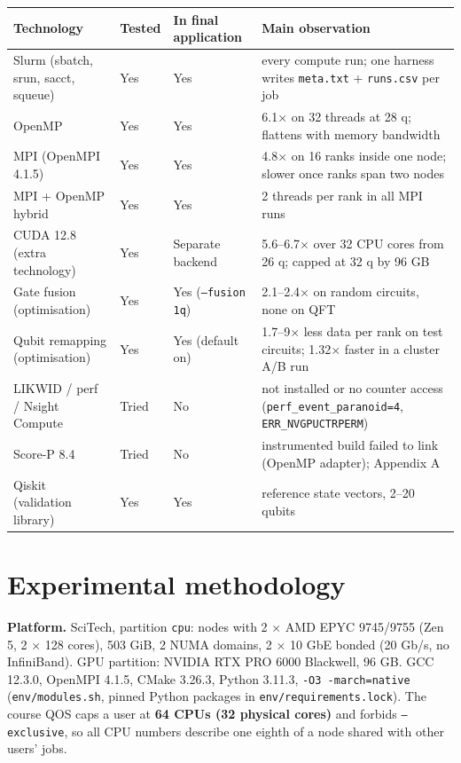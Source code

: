 \documentclass[10pt,a4paper]{article}
\begin{document}
\begin{table}[ht]\centering\small
\begin{tabularx}{\linewidth}{@{}XllX@{}}
\toprule
\textbf{Technology} & \textbf{Tested} & \textbf{In final application} & \textbf{Main observation} \\
\midrule
Slurm (sbatch, srun, sacct, squeue) & Yes & Yes & every compute run; one harness writes \texttt{meta.txt} + \texttt{runs.csv} per job \\
OpenMP & Yes & Yes & 6.1$\times$ on 32 threads at 28 q; flattens with memory bandwidth \\
MPI (OpenMPI 4.1.5) & Yes & Yes & 4.8$\times$ on 16 ranks inside one node; slower once ranks span two nodes \\
MPI + OpenMP hybrid & Yes & Yes & 2 threads per rank in all MPI runs \\
CUDA 12.8 (extra technology) & Yes & Separate backend & 5.6--6.7$\times$ over 32 CPU cores from 26 q; capped at 32 q by 96 GB \\
Gate fusion (optimisation) & Yes & Yes (\texttt{--fusion 1q}) & 2.1--2.4$\times$ on random circuits, none on QFT \\
Qubit remapping (optimisation) & Yes & Yes (default on) & 1.7--9$\times$ less data per rank on test circuits; 1.32$\times$ faster in a cluster A/B run \\
LIKWID / perf / Nsight Compute & Tried & No & not installed or no counter access (\texttt{perf\_event\_paranoid=4}, \texttt{ERR\_NVGPUCTRPERM}) \\
Score-P 8.4 & Tried & No & instrumented build failed to link (OpenMP adapter); Appendix A \\
Qiskit (validation library) & Yes & Yes & reference state vectors, 2--20 qubits \\
\bottomrule
\end{tabularx}
\end{table}



\section{Experimental methodology}



\textbf{Platform.} SciTech, partition \texttt{cpu}: nodes with 2 $\times$ AMD EPYC 9745/9755 (Zen 5, 2 $\times$ 128 cores), 503 GiB, 2 NUMA domains, 2 $\times$ 10 GbE bonded (20 Gb/s, no InfiniBand). GPU partition: NVIDIA RTX PRO 6000 Blackwell, 96 GB. GCC 12.3.0, OpenMPI 4.1.5, CMake 3.26.3, Python 3.11.3, \texttt{-O3 -march=native} (\texttt{env/modules.sh}, pinned Python packages in \texttt{env/requirements.lock}). The course QOS caps a user at \textbf{64 CPUs (32 physical cores)} and forbids \texttt{--exclusive}, so all CPU numbers describe one eighth of a node shared with other users' jobs.
\end{document}
